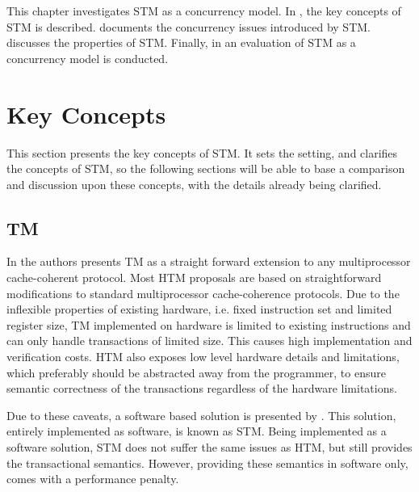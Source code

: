 \makeatletter {}\makeatother
{}
This chapter investigates \ac{STM} as a concurrency model. In , the key concepts of \ac{STM} is described.  documents the concurrency issues introduced by \ac{STM}.  discusses the properties of \ac{STM}. Finally, in  an evaluation of \ac{STM} as a concurrency model is conducted.
\label{chap:stm}

\section{Key Concepts}
\label{sec:stm_keyconcepts}
This section presents the key concepts of \ac{STM}. It sets the setting, and clarifies the concepts of \ac{STM}, so the following sections will be able to base a comparison and discussion upon these concepts, with the details already being clarified.

\subsection{\acl{TM}}
\label{sec:tmevo}
In \cite{herlihy1993transactional} the authors presents \ac{TM} as a straight forward extension to any multiprocessor cache-coherent protocol. Most \ac{HTM} proposals are based on straightforward modifications to standard multiprocessor cache-coherence protocols\cite{herlihy2011tm}. Due to the inflexible properties of existing hardware, i.e. fixed instruction set and limited register size, \ac{TM} implemented on hardware is limited to existing instructions and can only handle transactions of limited size\cite{dragojevic2011stm}. This causes high implementation and verification costs\cite{cascaval2008software}. \ac{HTM} also exposes low level hardware details and limitations\cite{herlihy2011tm}, which preferably should be abstracted away from the programmer, to ensure semantic correctness of the transactions regardless of the hardware limitations. 

Due to these caveats, a software based solution is presented by \cite{shavit1997software}. This solution, entirely implemented as software, is known as \acl{STM}. Being implemented as a software solution, \ac{STM} does not suffer the same issues as \ac{HTM}, but still provides the transactional semantics. However, providing these semantics in software only, comes with a performance penalty\cite{cascaval2008software}\cite{dragojevic2011stm}.

